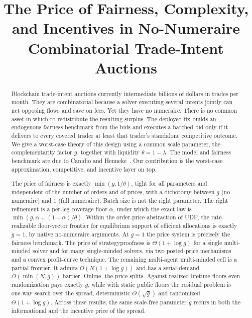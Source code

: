 \documentclass{llncs}
\begin{document}
\title{The Price of Fairness, Complexity, and Incentives in
No-Numeraire Combinatorial Trade-Intent Auctions}

\makeatletter
\gdef\@author{}
\gdef\@institute{}
\makeatother

\maketitle

\begin{abstract}
Blockchain trade-intent auctions currently intermediate billions of
dollars in trades per month. They are combinatorial because a solver
executing several intents jointly can net opposing flows and save on
fees. Yet they have no numeraire. There is no common asset in which to
redistribute the resulting surplus. The deployed fix builds an endogenous fairness
benchmark from the bids and executes a batched bid only if it delivers to
every covered trader at least that trader's standalone competitive
outcome. We give a worst-case theory of this design using a common scale
parameter, the complementarity factor $g$, together with liquidity
$\theta=1-\lambda$.
The model and fairness benchmark are due to Canidio and
Henneke~\cite{canidio2024}. Our contribution is the worst-case
approximation, competitive, and incentive layer on top.

The price of fairness is exactly $\min(g,1/\theta)$, tight for all
parameters and independent of the number of orders and of prices, with a
dichotomy between $g$ (no numeraire) and $1$ (full numeraire). Batch size
is not the right parameter. The right refinement is a per-leg coverage
floor $\alpha$, under which the exact law is
$\min(g,\alpha+(1-\alpha)/\theta)$. Within the order-price abstraction of
UDP, the rate-realizable floor-vector frontier for equilibrium support of
efficient allocations is exactly $g=1$, by native no-numeraire arguments.
At $g=1$ the price system is precisely the fairness benchmark. The price of
strategyproofness is $\Theta(1+\log g)$ for a single multi-minded solver
and for many single-minded solvers, via two posted-price mechanisms and a
convex profit-curve technique. The remaining multi-agent multi-minded
cell is a partial frontier. It admits $O(N(1+\log g))$ and has a serial-demand
$\Omega(\min(N,g))$ barrier. Online, the price splits. Against realized
lifetime floors even randomization pays exactly $g$, while with static
public floors the residual problem is one-way search over the spread,
deterministic $\Theta(\sqrt g)$ and randomized $\Theta(1+\log g)$.
Across these results, the same scale-free parameter $g$ recurs in both
the informational and the incentive price of the spread.
\end{abstract}
\end{document}
